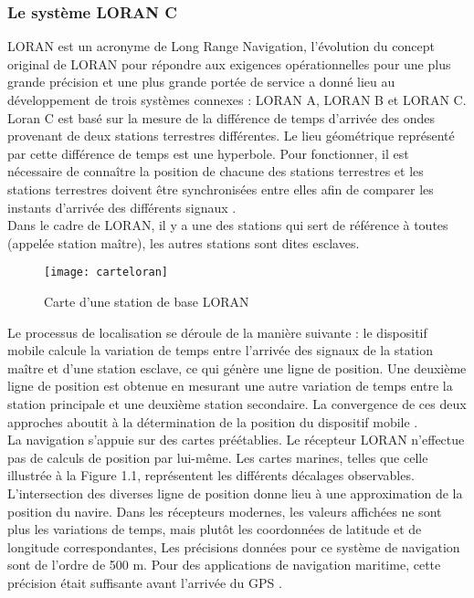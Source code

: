 \subsubsection{Le système LORAN C}

LORAN est un acronyme de Long Range Navigation, l’évolution du concept original de LORAN pour répondre aux exigences opérationnelles pour une plus grande précision et une plus grande portée de service a donné lieu au développement de trois systèmes connexes : LORAN A, LORAN B et LORAN C.\\

Loran C est basé sur la mesure de la différence de temps d’arrivée des ondes provenant de deux stations terrestres différentes. Le lieu géométrique représenté par cette différence de temps est une hyperbole. Pour fonctionner, il est nécessaire de connaître la position de chacune des stations terrestres et les stations terrestres doivent être synchronisées entre elles afin de comparer les instants d’arrivée des différents signaux \cite{frederic_evennou_techniques_2007}.\\

Dans le cadre de LORAN, il y a une des stations qui sert de référence à toutes  (appelée station maître), les autres stations sont dites esclaves.
\begin{figure}[H]
	\texttt{[image: carteloran]}
	\caption{Carte d’une station de base LORAN}
\end{figure}

Le processus de localisation se déroule de la manière suivante : le dispositif mobile calcule la variation de temps entre l'arrivée des signaux de la station maître et d'une station esclave, ce qui génère une ligne de position. Une deuxième ligne de position est obtenue en mesurant une autre variation de temps entre la station principale et une deuxième station secondaire. La convergence de ces deux approches aboutit à la détermination de la position du dispositif mobile \cite{frederic_evennou_techniques_2007}.\\

La navigation s'appuie sur des cartes préétablies. Le récepteur LORAN n'effectue pas de calculs de position par lui-même. Les cartes marines, telles que celle illustrée à la Figure 1.1, représentent les différents décalages observables. L'intersection des diverses ligne de position donne lieu à une approximation de la position du navire. Dans les récepteurs modernes, les valeurs affichées ne sont plus les variations de temps, mais plutôt les coordonnées de latitude et de longitude correspondantes, Les précisions données pour ce système de navigation sont de l’ordre de 500 m. Pour des applications de navigation maritime, cette précision était suffisante avant l’arrivée du GPS \cite{frederic_evennou_techniques_2007}.

